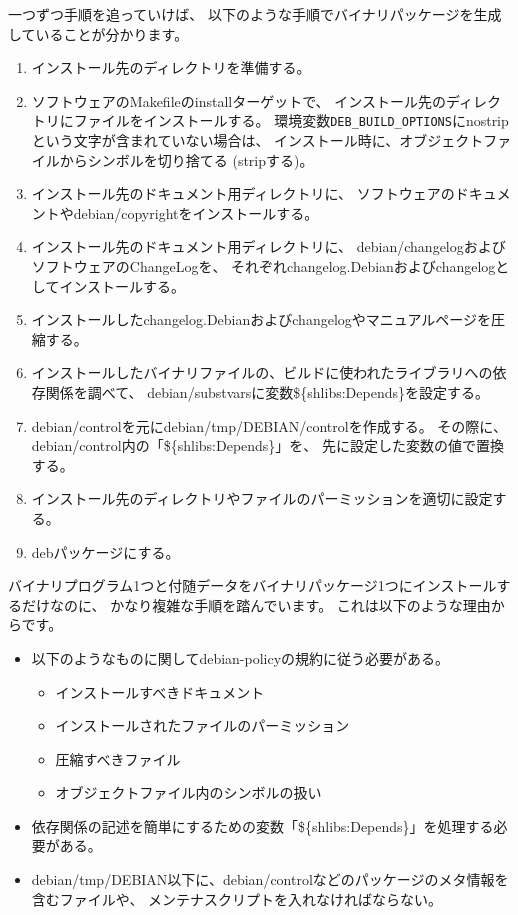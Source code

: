 \documentclass[mingoth,a4paper]{jsarticle}
\begin{document}
一つずつ手順を追っていけば、
以下のような手順でバイナリパッケージを生成していることが分かります。

\begin{enumerate}
 \item インストール先のディレクトリを準備する。
 \item ソフトウェアのMakefileのinstallターゲットで、
    インストール先のディレクトリにファイルをインストールする。
    環境変数\texttt{DEB\_BUILD\_OPTIONS}にnostripという文字が含まれていない場合は、
    インストール時に、オブジェクトファイルからシンボルを切り捨てる (stripする)。
 \item インストール先のドキュメント用ディレクトリに、
    ソフトウェアのドキュメントやdebian/copyrightをインストールする。
 \item インストール先のドキュメント用ディレクトリに、
    debian/changelogおよびソフトウェアのChangeLogを、
    それぞれchangelog.Debianおよびchangelogとしてインストールする。
 \item インストールしたchangelog.Debianおよびchangelogやマニュアルページを圧縮する。
 \item インストールしたバイナリファイルの、ビルドに使われたライブラリへの依存関係を調べて、
    debian/substvarsに変数\$\{shlibs:Depends\}を設定する。
 \item debian/controlを元にdebian/tmp/DEBIAN/controlを作成する。
    その際に、debian/control内の「\$\{shlibs:Depends\}」を、
    先に設定した変数の値で置換する。
 \item インストール先のディレクトリやファイルのパーミッションを適切に設定する。
 \item debパッケージにする。
\end{enumerate}

バイナリプログラム1つと付随データをバイナリパッケージ1つにインストールするだけなのに、
かなり複雑な手順を踏んでいます。
これは以下のような理由からです。

\begin{itemize}
 \item 以下のようなものに関してdebian-policyの規約に従う必要がある。
\begin{itemize}
 \item インストールすべきドキュメント
 \item インストールされたファイルのパーミッション
 \item 圧縮すべきファイル
 \item オブジェクトファイル内のシンボルの扱い
\end{itemize} 
 \item 依存関係の記述を簡単にするための変数「\$\{shlibs:Depends\}」を処理する必要がある。
 \item debian/tmp/DEBIAN以下に、debian/controlなどのパッケージのメタ情報を含むファイルや、
  メンテナスクリプトを入れなければならない。
\end{itemize}
\end{document}
